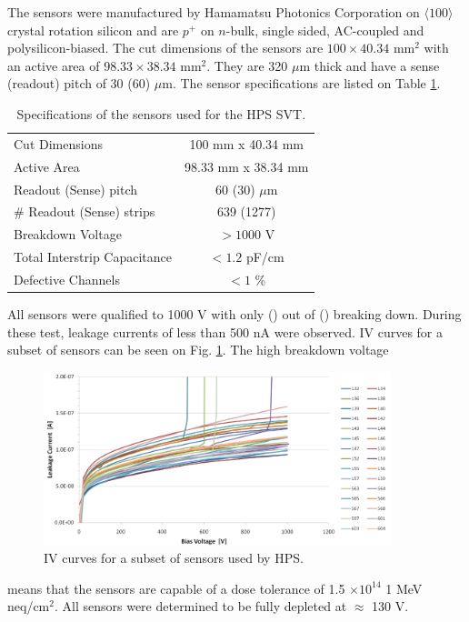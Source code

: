 The sensors were manufactured by Hamamatsu Photonics Corporation on 
$\langle 100 \rangle$ crystal rotation silicon and are $p^{+}$ on $n$-bulk, 
single sided, AC-coupled and polysilicon-biased. The cut dimensions of the 
sensors are $100 \times 40.34$ mm$^{2}$ with an active area of 
$98.33 \times 38.34$ mm$^{2}$.  They are 320 $\mu$m thick and have a sense
(readout) pitch of 30 (60) $\mu$m. The sensor specifications are listed on 
Table \ref{tab:sensor_specs}.
\begin{table}[t]
    \centering
    \begin{tabular}{l|c}
        \hline
        Cut Dimensions & 100 mm x 40.34 mm \\
        Active Area & 98.33 mm x 38.34 mm \\
        Readout (Sense) pitch & 60 (30) $\mu$m \\
        \# Readout (Sense) strips & 639 (1277) \\
        Breakdown Voltage & $ > 1000$ V \\
        Total Interstrip Capacitance & $< 1.2$ pF/cm \\
        Defective Channels & $<1$ \% \\
        \hline
    \end{tabular}
    \caption{Specifications of the sensors used for the HPS SVT.}
    \label{tab:sensor_specs}
\end{table}

All sensors were qualified to 1000 V with only () out of () breaking down.  
During these test, leakage currents of less than 500 nA were observed.
IV curves for a subset of sensors can be seen on Fig. \ref{fig:sensor_iv_curves}.
The high breakdown voltage
\begin{figure}
    \centering
    \includegraphics[width=0.9\textwidth]{images/sensor_iv_curves.png}
    \caption{IV curves for a subset of sensors used by HPS.}
    \label{fig:sensor_iv_curves}
\end{figure}
means that the sensors are capable of a dose tolerance of  1.5 
$\times 10^{14}$ 1 MeV neq/cm$^{2}$.  All sensors were determined to be fully 
depleted at $\approx$ 130 V. 

